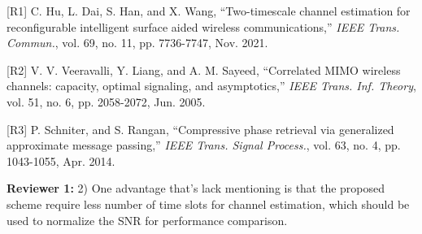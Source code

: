 \documentclass[a4paper,12pt]{article}
\begin{document}
{{[R1] C. Hu, L. Dai, S. Han, and X. Wang, ``Two-timescale channel estimation for  reconfigurable intelligent  surface  aided  wireless  communications,'' {\it IEEE Trans. Commun.}, vol. 69, no. 11, pp. 7736-7747, Nov. 2021.

[R2] V. V. Veeravalli, Y. Liang, and A. M. Sayeed, ``Correlated MIMO wireless channels: capacity, optimal signaling, and asymptotics,'' {\it IEEE Trans. Inf. Theory}, vol. 51, no. 6, pp. 2058-2072, Jun. 2005. 

[R3] P. Schniter, and S. Rangan, ``Compressive phase retrieval via generalized approximate message passing,'' {\it IEEE Trans. Signal Process.}, vol. 63, no. 4, pp. 1043-1055, Apr. 2014. 

}}

\textbf{Reviewer 1:}
2) One advantage that's lack mentioning is that the proposed scheme require less number of time slots for channel estimation, which should be used to normalize the SNR for performance comparison.
\end{document}

